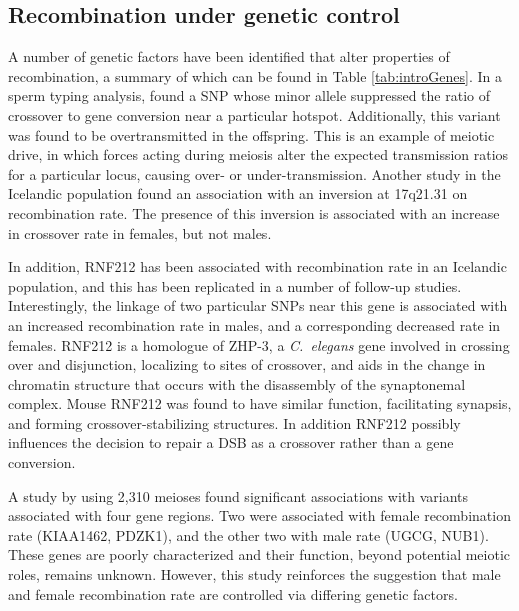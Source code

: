 \subsection{Recombination under genetic control}

A number of genetic factors have been identified that alter properties of recombination, a summary of which can be found in Table \ref{tab:introGenes}.
In a sperm typing analysis, \citet{Jeffreys2005} found a SNP whose minor allele suppressed the ratio of crossover to gene conversion near a particular hotspot.
Additionally, this variant was found to be overtransmitted in the offspring.
This is an example of meiotic drive, in which forces acting during meiosis alter the expected transmission ratios for a particular locus, causing over- or under-transmission.
Another study in the Icelandic population found an association with an inversion at 17q21.31 on recombination rate\cite{Stefansson2005}.
The presence of this inversion is associated with an increase in crossover rate in females, but not males.

In addition, RNF212 has been associated with recombination rate in an Icelandic population\cite{Kong2008}, and this has been replicated in a number of follow-up studies\cite{Chowdhury2009,Fledel-Alon2011,Reynolds2013,Kong2014}.
Interestingly, the linkage of two particular SNPs near this gene is associated with an increased recombination rate in males, and a corresponding decreased rate in females.
RNF212 is a homologue of ZHP-3, a \textit{C.\ elegans} gene involved in crossing over and disjunction, localizing to sites of crossover, and aids in the change in chromatin structure that occurs with the disassembly of the synaptonemal complex\cite{Bhalla2008}.
Mouse RNF212 was found to have similar function, facilitating synapsis, and forming crossover-stabilizing structures\cite{Reynolds2013}.
In addition RNF212 possibly influences the decision to repair a DSB as a crossover rather than a gene conversion\cite{Reynolds2013}.

A study by \citet{Chowdhury2009} using 2,310 meioses found significant associations with variants associated with four gene regions.
Two were associated with female recombination rate (KIAA1462, PDZK1), and the other two with male rate (UGCG, NUB1).
These genes are poorly characterized and their function, beyond potential meiotic roles, remains unknown.
However, this study reinforces the suggestion that male and female recombination rate are controlled via differing genetic factors.

